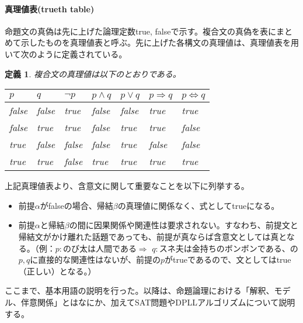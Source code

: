 \documentclass[dvipdfmx]{jsarticle}
\newtheorem{dfn}{定義}
\begin{document}
  \paragraph{真理値表(trueth table)}
  命題文の真偽は先に上げた論理定数true, falseで示す。複合文の真偽を表にまとめて示したものを真理値表と呼ぶ。先に上げた各構文の真理値は、真理値表を用いて次のように定義されている。
\begin{dfn}
  複合文の真理値は以下のとおりである。
  \begin{table}[H]
      \centering
  \begin{tabular}{|l|l||l|l|l|l|l|} \hline
    $p$   & $q$   & $\neg p$ & $p \wedge q$ & $p \vee q$ & $p \Rightarrow q$ & $p \Leftrightarrow q$ \\ \hline
    false & false & true     & false        & false      & true              & true                \\ \hline
    false & true  & true     & false        & true       & true              & false               \\ \hline
    true  & false & false    & false        & true       & false             & false               \\ \hline
    true  & true  & false    & true         & true       & true              & true \\ \hline
  \end{tabular}
  \end{table}
\end{dfn}
上記真理値表より、含意文に関して重要なことを以下に列挙する。
\begin{itemize}
    \item 前提$\alpha$がfalseの場合、帰結$\beta$の真理値に関係なく、式としてtrueになる。
    \item 前提$\alpha$と帰結$\beta$の間に因果関係や関連性は要求されない。すなわち、前提文と帰結文がかけ離れた話題であっても、前提が真ならば含意文としては真となる。（例：$p:$のび太は人間である$\Rightarrow$ $q:$スネ夫は金持ちのボンボンである、の$p,q$に直接的な関連性はないが、前提の$p$がtrueであるので、文としてはtrue（正しい）となる。）
\end{itemize}
ここまで、基本用語の説明を行った。以降は、命題論理における「解釈、モデル、伴意関係」とはなにか、加えてSAT問題やDPLLアルゴリズムについて説明する。
\end{document}
